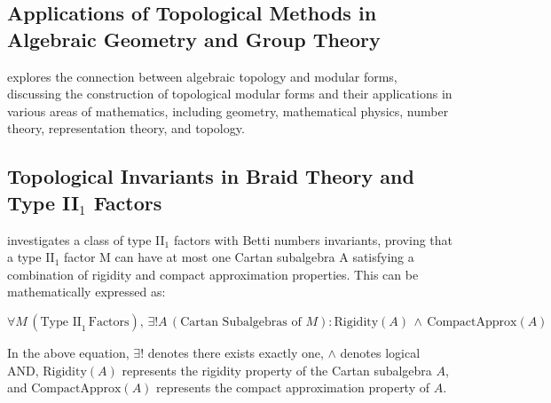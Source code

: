 \documentclass{article}
\begin{document}
\subsection{Applications of Topological Methods in Algebraic Geometry and Group Theory}

\cite{Hopkins2002AlgebraicTA} explores the connection between algebraic topology and modular forms, discussing the construction of topological modular forms and their applications in various areas of mathematics, including geometry, mathematical physics, number theory, representation theory, and topology.

\subsection{Topological Invariants in Braid Theory and Type II$_1$ Factors}

\cite{Popa2002OnAC} investigates a class of type II$_1$ factors with Betti numbers invariants, proving that a type II$_1$ factor M can have at most one Cartan subalgebra A satisfying a combination of rigidity and compact approximation properties. This can be mathematically expressed as:

\[
\forall M \, (\text{Type II}_1 \, \text{Factors}), \, \exists! A \, (\text{Cartan Subalgebras of } M) : \text{Rigidity}(A) \, \land \, \text{CompactApprox}(A)
\]

In the above equation, \(\exists!\) denotes there exists exactly one, \(\land\) denotes logical AND, \(\text{Rigidity}(A)\) represents the rigidity property of the Cartan subalgebra \(A\), and \(\text{CompactApprox}(A)\) represents the compact approximation property of \(A\).


%
%
%
%
%
\end{document}
